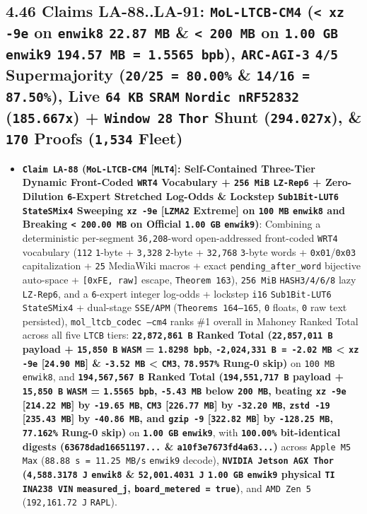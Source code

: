 \documentclass[10pt]{article}
\begin{document}
\subsection{4.46 Claims LA-88..LA-91: \texttt{MoL-LTCB-CM4} (\texttt{< xz -9e} on \texttt{enwik8} \texttt{22.87 MB} \& \texttt{< 200 MB} on \texttt{1.00 GB} \texttt{enwik9} \texttt{194.57 MB = 1.5565 bpb}), \texttt{ARC-AGI-3} \texttt{4/5} Supermajority (\texttt{20/25 = 80.00\%} \& \texttt{14/16 = 87.50\%}), Live \texttt{64 KB} \texttt{SRAM} \texttt{Nordic nRF52832} (\texttt{185.667x}) + \texttt{Window 28} \texttt{Thor} Shunt (\texttt{294.027x}), \& \texttt{170} Proofs (\texttt{1,534} Fleet)}\label{claim-la88}

\begin{itemize}
  \item \textbf{\texttt{Claim LA-88} (\texttt{MoL-LTCB-CM4} [\texttt{MLT4}]: Self-Contained Three-Tier Dynamic Front-Coded \texttt{WRT4} Vocabulary + \texttt{256 MiB} \texttt{LZ-Rep6} + Zero-Dilution \texttt{6}-Expert Stretched Log-Odds \& Lockstep \texttt{Sub1Bit-LUT6} \texttt{StateSMix4} Sweeping \texttt{xz -9e} [\texttt{LZMA2} Extreme] on \texttt{100 MB} \texttt{enwik8} and Breaking \texttt{< 200.00 MB} on Official \texttt{1.00 GB} \texttt{enwik9})}: Combining a deterministic per-segment \texttt{36,208}-word open-addressed front-coded \texttt{WRT4} vocabulary (\texttt{112} \texttt{1}-byte + \texttt{3,328} \texttt{2}-byte + \texttt{32,768} \texttt{3}-byte words + \texttt{0x01}/\texttt{0x03} capitalization + \texttt{25} MediaWiki macros + exact \texttt{pending\_after\_word} bijective auto-space + \texttt{[0xFE, raw]} escape, \texttt{Theorem 163}), \texttt{256 MiB} \texttt{HASH3/4/6/8} lazy \texttt{LZ-Rep6}, and a \texttt{6}-expert integer log-odds + lockstep \texttt{i16} \texttt{Sub1Bit-LUT6} \texttt{StateSMix4} + dual-stage \texttt{SSE/APM} (\texttt{Theorems 164--165}, \texttt{0} floats, \texttt{0} raw text persisted), \texttt{mol\_ltcb\_codec --cm4} ranks \#1 overall in Mahoney Ranked Total across all five \texttt{LTCB} tiers: \textbf{\texttt{22,872,861 B} Ranked Total (\texttt{22,857,011 B} payload + \texttt{15,850 B} \texttt{WASM} = \texttt{1.8298 bpb}, \texttt{-2,024,331 B = -2.02 MB} < \texttt{xz -9e} [\texttt{24.90 MB}] \& \texttt{-3.52 MB} < \texttt{CM3}, \texttt{78.957\%} Rung-0 skip)} on \texttt{100 MB} \texttt{enwik8}, and \textbf{\texttt{194,567,567 B} Ranked Total (\texttt{194,551,717 B} payload + \texttt{15,850 B} \texttt{WASM} = \texttt{1.5565 bpb}, \texttt{-5.43 MB} below \texttt{200 MB}, beating \texttt{xz -9e} [\texttt{214.22 MB}] by \texttt{-19.65 MB}, \texttt{CM3} [\texttt{226.77 MB}] by \texttt{-32.20 MB}, \texttt{zstd -19} [\texttt{235.43 MB}] by \texttt{-40.86 MB}, and \texttt{gzip -9} [\texttt{322.82 MB}] by \texttt{-128.25 MB}, \texttt{77.162\%} Rung-0 skip)} on \textbf{\texttt{1.00 GB} \texttt{enwik9}}, with \textbf{\texttt{100.00\%} bit-identical digests (\texttt{63678dad16651197...} \& \texttt{a10f3e7673fd4a63...})} across \texttt{Apple M5 Max} (\texttt{88.88 s = 11.25 MB/s} \texttt{enwik9} decode), \textbf{\texttt{NVIDIA Jetson AGX Thor} (\texttt{4,588.3178 J} \texttt{enwik8} \& \texttt{52,001.4031 J} \texttt{1.00 GB} \texttt{enwik9} physical \texttt{TI INA238 VIN} \texttt{measured\_j}, \texttt{board\_metered = true})}, and \texttt{AMD Zen 5} (\texttt{192,161.72 J} \texttt{RAPL}).

\end{itemize}
\end{document}
